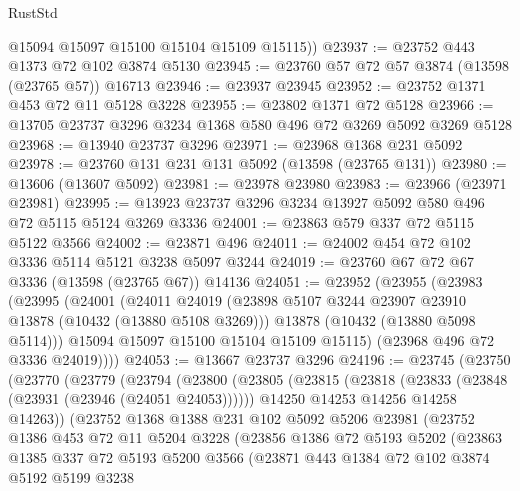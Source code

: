 \begin{lexlean}{RustStd}
\begin{coremodule}
        @15094
        @15097
        @15100
        @15104
        @15109
        @15115))
@23937 := @23752 @443 @1373 @72 @102 @3874 @5130
@23945 := @23760 @57 @72 @57 @3874 (@13598 (@23765 @57)) @16713
@23946 := @23937 @23945
@23952 := @23752 @1371 @453 @72 @11 @5128 @3228
@23955 := @23802 @1371 @72 @5128
@23966 := @13705 @23737 @3296 @3234 @1368 @580 @496 @72 @3269 @5092 @3269 @5128
@23968 := @13940 @23737 @3296
@23971 := @23968 @1368 @231 @5092
@23978 := @23760 @131 @231 @131 @5092 (@13598 (@23765 @131))
@23980 := @13606 (@13607 @5092)
@23981 := @23978 @23980
@23983 := @23966 (@23971 @23981)
@23995 := @13923 @23737 @3296 @3234 @13927 @5092 @580 @496 @72 @5115 @5124 @3269 @3336
@24001 := @23863 @579 @337 @72 @5115 @5122 @3566
@24002 := @23871 @496
@24011 := @24002 @454 @72 @102 @3336 @5114 @5121 @3238 @5097 @3244
@24019 := @23760 @67 @72 @67 @3336 (@13598 (@23765 @67)) @14136
@24051 := @23952
    (@23955
      (@23983
        (@23995
          (@24001
            (@24011
              @24019
              (@23898 @5107 @3244 @23907 @23910 @13878 (@10432 (@13880 @5108 @3269)))
              @13878
              (@10432 (@13880 @5098 @5114)))
            @15094
            @15097
            @15100
            @15104
            @15109
            @15115)
          (@23968 @496 @72 @3336 @24019))))
@24053 := @13667 @23737 @3296
@24196 := @23745
    (@23750
      (@23770
        (@23779
          (@23794
            (@23800
              (@23805
                (@23815
                  (@23818 (@23833 (@23848 (@23931 (@23946 (@24051 @24053))))))
                  @14250
                  @14253
                  @14256
                  @14258
                  @14263))
              (@23752
                @1368
                @1388
                @231
                @102
                @5092
                @5206
                @23981
                (@23752
                  @1386
                  @453
                  @72
                  @11
                  @5204
                  @3228
                  (@23856
                    @1386
                    @72
                    @5193
                    @5202
                    (@23863
                      @1385
                      @337
                      @72
                      @5193
                      @5200
                      @3566
                      (@23871
                        @443
                        @1384
                        @72
                        @102
                        @3874
                        @5192
                        @5199
                        @3238

\end{coremodule}
\end{lexlean}
